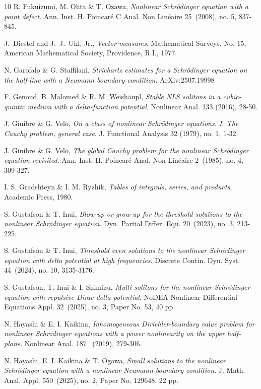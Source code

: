 \documentclass[11pt,letter]{amsart}
\numberwithin{equation}{section}
\numberwithin{equation}{section}
\begin{document}
\begin{thebibliography}{10}
R. Fukuizumi, M. Ohta \& T. Ozawa, 
\emph{Nonlinear Schr\"odinger equation with a point defect}.
Ann. Inst. H. Poincar\'e C Anal. Non Lin\'eaire 25~(2008), no. 5, 837-845.

 J.~Diestel and J.~J.~Uhl, Jr., \emph{Vector measures}, Mathematical Surveys, No. 15, American Mathematical Society, Providence, R.I., 1977.

N. Garofalo \& G. Staffilani, \emph{Strichartz estimates for a Schr\"odinger equation on the half-line with a Neumann boundary condition}. ArXiv:2507.19998 

F. Genoud, B. Malomed \& R. M. Weish\"aupl, \emph{ Stable NLS solitons in a cubic-quintic medium with a delta-function potential}.
Nonlinear Anal. 133 (2016), 28-50.

J. Ginibre \& G. Velo, \emph{On a class of nonlinear Schr\"odinger equations. I. The Cauchy problem, general case}.
J. Functional Analysis 32 (1979), no. 1, 1-32.

J. Ginibre \& G. Velo, \emph{The global Cauchy problem for the nonlinear Schr\"odinger equation revisited}.
Ann. Inst. H. Poincar\'e Anal. Non Lin\'eaire 2~(1985), no. 4, 309-327.


I. S. Gradshteyn \& I. M. Ryzhik, \emph{Tables of integrals, series,
and products}, Academic Press, 1980.

S. Gustafson \& T. Inui, \emph{Blow-up or grow-up for the threshold solutions to the nonlinear Schr\"odinger equation}.
Dyn. Partial Differ. Equ. 20~(2023), no. 3, 213-225.

S. Gustafson \& T. Inui, \emph{Threshold even solutions to the nonlinear Schr\"odinger equation with delta potential at high frequencies}.
Discrete Contin. Dyn. Syst. 44~(2024), no. 10, 3135-3176.

S. Gustafson, T. Inui \& I. Shimizu, \emph{
Multi-solitons for the nonlinear Schr\"odinger equation with repulsive Dirac delta potential}.
NoDEA Nonlinear Differential Equations Appl. 32~(2025), no. 3, Paper No. 53, 40 pp.


N. Hayashi \& E. I. Kaikina, \emph{
Inhomogeneous Dirichlet-boundary value problem for nonlinear Schr\"odinger equations with a power nonlinearity on the upper half-plane}.
Nonlinear Anal. 187 ~(2019), 279-306.

N. Hayashi, E. I. Kaikina \& T. Ogawa, \emph{
Small solutions to the nonlinear Schr\"odinger equation with a nonlinear Neumann boundary condition}.
J. Math. Anal. Appl. 550~(2025), no. 2, Paper No. 129648, 22 pp.


\end{thebibliography}
\end{document}
